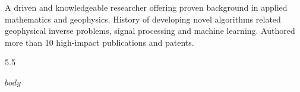 \documentclass[9pt]{developercv} %
\begin{document}
\vspace{0.5cm}



\begin{minipage}[t]{0.4\textwidth} %
	\vspace{\baselineskip} %
	A driven and knowledgeable researcher offering proven background in applied mathematics and geophysics. History of developing novel algorithms related geophysical inverse problems, signal processing and machine learning.
	Authored more than 10 high-impact publications and patents.

\end{minipage}
\hfill %
\begin{minipage}[t]{0.5\textwidth} %
	\vspace{-\baselineskip} %
	\begin{barchart}{5.5}
	\end{barchart}
\end{minipage}

\begin{center}
\end{center}

$body$
\end{document}
